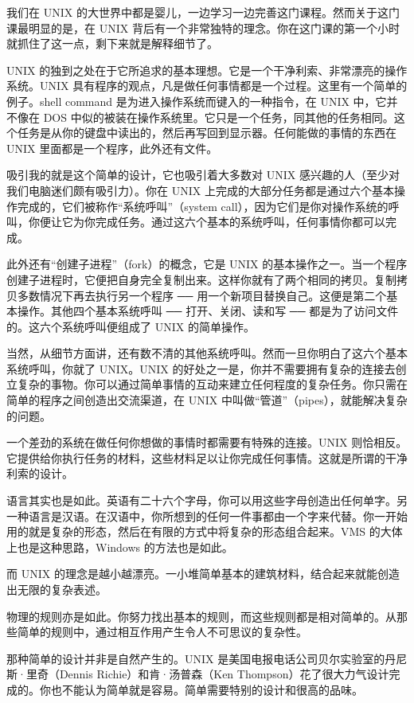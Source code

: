 我们在 UNIX 的大世界中都是婴儿，一边学习一边完善这门课程。然而关于这门课最明显的是，在 UNIX 背后有一个非常独特的理念。你在这门课的第一个小时就抓住了这一点，剩下来就是解释细节了。

UNIX 的独到之处在于它所追求的基本理想。它是一个干净利索、非常漂亮的操作系统。UNIX 具有程序的观点，凡是做任何事情都是一个过程。这里有一个简单的例子。shell command 是为进入操作系统而键入的一种指令，在 UNIX 中，它并不像在 DOS 中似的被装在操作系统里。它只是一个任务，同其他的任务相同。这个任务是从你的键盘中读出的，然后再写回到显示器。任何能做的事情的东西在 UNIX 里面都是一个程序，此外还有文件。

吸引我的就是这个简单的设计，它也吸引着大多数对 UNIX 感兴趣的人（至少对我们电脑迷们颇有吸引力）。你在 UNIX 上完成的大部分任务都是通过六个基本操作完成的，它们被称作“系统呼叫”（system call），因为它们是你对操作系统的呼叫，你便让它为你完成任务。通过这六个基本的系统呼叫，任何事情你都可以完成。

此外还有“创建子进程”（fork）的概念，它是 UNIX 的基本操作之一。当一个程序创建子进程时，它便把自身完全复制出来。这样你就有了两个相同的拷贝。复制拷贝多数情况下再去执行另一个程序 ── 用一个新项目替换自己。这便是第二个基本操作。其他四个基本系统呼叫 ── 打开、关闭、读和写 ── 都是为了访问文件的。这六个系统呼叫便组成了 UNIX 的简单操作。

当然，从细节方面讲，还有数不清的其他系统呼叫。然而一旦你明白了这六个基本系统呼叫，你就了 UNIX。UNIX 的好处之一是，你并不需要拥有复杂的连接去创立复杂的事物。你可以通过简单事情的互动来建立任何程度的复杂任务。你只需在简单的程序之间创造出交流渠道，在 UNIX 中叫做“管道”（pipes），就能解决复杂的问题。

一个差劲的系统在做任何你想做的事情时都需要有特殊的连接。UNIX 则恰相反。它提供给你执行任务的材料，这些材料足以让你完成任何事情。这就是所谓的干净利索的设计。

语言其实也是如此。英语有二十六个字母，你可以用这些字母创造出任何单字。另一种语言是汉语。在汉语中，你所想到的任何一件事都由一个字来代替。你一开始用的就是复杂的形态，然后在有限的方式中将复杂的形态组合起来。VMS 的大体上也是这种思路，Windows 的方法也是如此。

而 UNIX 的理念是越小越漂亮。一小堆简单基本的建筑材料，结合起来就能创造出无限的复杂表述。

物理的规则亦是如此。你努力找出基本的规则，而这些规则都是相对简单的。从那些简单的规则中，通过相互作用产生令人不可思议的复杂性。

那种简单的设计并非是自然产生的。UNIX 是美国电报电话公司贝尔实验室的丹尼斯·里奇（Dennis Richie）和肯·汤普森（Ken Thompson）花了很大力气设计完成的。你也不能认为简单就是容易。简单需要特别的设计和很高的品味。

